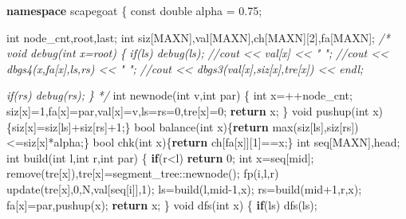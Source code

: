 \documentclass[
]{article}
\newenvironment{Shaded}{}{}
\newcommand{\AttributeTok}[1]{\textcolor[rgb]{0.49,0.56,0.16}{#1}}
\newcommand{\CommentTok}[1]{\textcolor[rgb]{0.38,0.63,0.69}{\textit{#1}}}
\newcommand{\ControlFlowTok}[1]{\textcolor[rgb]{0.00,0.44,0.13}{\textbf{#1}}}
\newcommand{\DataTypeTok}[1]{\textcolor[rgb]{0.56,0.13,0.00}{#1}}
\newcommand{\DecValTok}[1]{\textcolor[rgb]{0.25,0.63,0.44}{#1}}
\newcommand{\FloatTok}[1]{\textcolor[rgb]{0.25,0.63,0.44}{#1}}
\newcommand{\KeywordTok}[1]{\textcolor[rgb]{0.00,0.44,0.13}{\textbf{#1}}}
\newcommand{\NormalTok}[1]{#1}
\begin{document}
\begin{Shaded}
\begin{Highlighting}[]
\KeywordTok{namespace}\NormalTok{ scapegoat}
\NormalTok{\{}
    \AttributeTok{const} \DataTypeTok{double}\NormalTok{ alpha = }\FloatTok{0.75}\NormalTok{;}

    \DataTypeTok{int}\NormalTok{ node\_cnt,root,last;}
    \DataTypeTok{int}\NormalTok{ siz[MAXN],val[MAXN],ch[MAXN][}\DecValTok{2}\NormalTok{],fa[MAXN];}
\CommentTok{/*}
\CommentTok{    void debug(int x=root)}
\CommentTok{    \{}
\CommentTok{        if(ls) debug(ls);}
\CommentTok{        //cout \textless{}\textless{} val[x] \textless{}\textless{} " ";}
\CommentTok{        //cout \textless{}\textless{} dbgs4(x,fa[x],ls,rs) \textless{}\textless{} " ";}
\CommentTok{        //cout \textless{}\textless{} dbgs3(val[x],siz[x],tre[x]) \textless{}\textless{} endl;}

\CommentTok{        if(rs) debug(rs);}
\CommentTok{    \}}
\CommentTok{*/}
    \DataTypeTok{int}\NormalTok{ newnode(}\DataTypeTok{int}\NormalTok{ v,}\DataTypeTok{int}\NormalTok{ par)}
\NormalTok{    \{}
        \DataTypeTok{int}\NormalTok{ x=++node\_cnt;}
\NormalTok{        siz[x]=}\DecValTok{1}\NormalTok{,fa[x]=par,val[x]=v,ls=rs=}\DecValTok{0}\NormalTok{,tre[x]=}\DecValTok{0}\NormalTok{;}
        \ControlFlowTok{return}\NormalTok{ x;}
\NormalTok{    \}}
    \DataTypeTok{void}\NormalTok{ pushup(}\DataTypeTok{int}\NormalTok{ x)\{siz[x]=siz[ls]+siz[rs]+}\DecValTok{1}\NormalTok{;\}}
    \DataTypeTok{bool}\NormalTok{ balance(}\DataTypeTok{int}\NormalTok{ x)\{}\ControlFlowTok{return}\NormalTok{ max(siz[ls],siz[rs])\textless{}=siz[x]*alpha;\}}
    \DataTypeTok{bool}\NormalTok{ chk(}\DataTypeTok{int}\NormalTok{ x)\{}\ControlFlowTok{return}\NormalTok{ ch[fa[x]][}\DecValTok{1}\NormalTok{]==x;\}}
    \DataTypeTok{int}\NormalTok{ seq[MAXN],head;}
    \DataTypeTok{int}\NormalTok{ build(}\DataTypeTok{int}\NormalTok{ l,}\DataTypeTok{int}\NormalTok{ r,}\DataTypeTok{int}\NormalTok{ par)}
\NormalTok{    \{}
        \ControlFlowTok{if}\NormalTok{(r\textless{}l) }\ControlFlowTok{return} \DecValTok{0}\NormalTok{;}
        \DataTypeTok{int}\NormalTok{ x=seq[mid];}
\NormalTok{        remove(tre[x]),tre[x]=segment\_tree::newnode();}
\NormalTok{        fp(i,l,r) update(tre[x],}\DecValTok{0}\NormalTok{,N,val[seq[i]],}\DecValTok{1}\NormalTok{);}
\NormalTok{        ls=build(l,mid{-}}\DecValTok{1}\NormalTok{,x);}
\NormalTok{        rs=build(mid+}\DecValTok{1}\NormalTok{,r,x);}
\NormalTok{        fa[x]=par,pushup(x);}
        \ControlFlowTok{return}\NormalTok{ x;}
\NormalTok{    \}}
    \DataTypeTok{void}\NormalTok{ dfs(}\DataTypeTok{int}\NormalTok{ x)}
\NormalTok{    \{}
        \ControlFlowTok{if}\NormalTok{(ls) dfs(ls);}

\end{Highlighting}
\end{Shaded}
\end{document}
